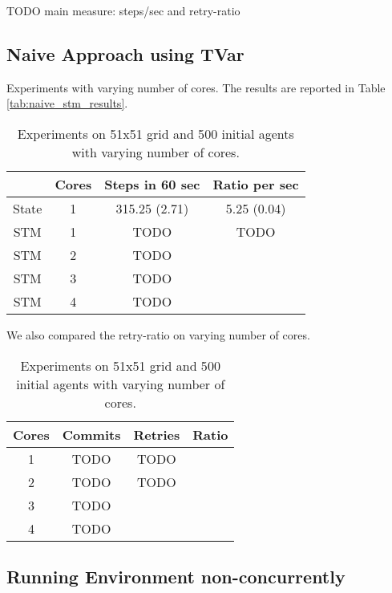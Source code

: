 TODO main measure: steps/sec and retry-ratio

\subsection{Naive Approach using TVar}
Experiments with varying number of cores. The results are reported in Table \ref{tab:naive_stm_results}.

\begin{table}
	\centering
  	\begin{tabular}{ c || c | c | c }
               & Cores & Steps in 60 sec & Ratio per sec \\ \hline \hline 
    	State  & 1     & 315.25 (2.71)   & 5.25 (0.04)   \\ \hline \hline
   		STM    & 1     & TODO            & TODO  \\ \hline
   		STM    & 2     & TODO            &       \\ \hline
   		STM    & 3     & TODO            &       \\ \hline
   		STM    & 4     & TODO            &       \\ \hline \hline
   	\end{tabular}
  	
  	\caption{Experiments on 51x51 grid and 500 initial agents with varying number of cores.}
	\label{tab:naive_results_time}
\end{table}

We also compared the retry-ratio on varying number of cores.

\begin{table}
	\centering
  	\begin{tabular}{ c || c | c | c }
        Cores & Commits & Retries & Ratio \\ \hline \hline 
    	1     & TODO              & TODO  \\ \hline \hline
   		2     & TODO              & TODO  \\ \hline
   		3     & TODO              &       \\ \hline
   		4     & TODO              &       \\ \hline
   	\end{tabular}
  	
  	\caption{Experiments on 51x51 grid and 500 initial agents with varying number of cores.}
	\label{tab:naive_results_retries}
\end{table}

\subsection{Running Environment non-concurrently}

